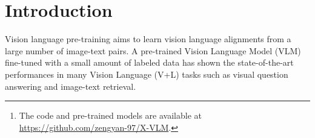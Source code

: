 \documentclass[nohyperref]{article}
\theoremstyle{plain}
\theoremstyle{definition}
\theoremstyle{remark}
\begin{document}





\printAffiliationsAndNotice{}  



\begin{abstract}
Most existing methods in vision language pre-training rely on object-centric features extracted through object detection and make fine-grained alignments between the extracted features and texts. It is challenging for these methods to learn relations among multiple objects. To this end, we propose a new method called X-VLM~\footnote{The code and pre-trained models are available at \url{https://github.com/zengyan-97/X-VLM}.} to perform `multi-grained vision language pre-training.' The key to learning multi-grained alignments is to locate visual concepts in the image given the associated texts, and in the meantime align the texts with the visual concepts, where the alignments are in multi-granularity. Experimental results show that X-VLM effectively leverages the learned multi-grained alignments to many downstream vision language tasks and consistently outperforms state-of-the-art methods.
\end{abstract}


\section{Introduction}
Vision language pre-training aims to learn vision language alignments from a large number of image-text pairs. A pre-trained Vision Language Model (VLM) fine-tuned with a small amount of labeled data has shown the state-of-the-art performances in many Vision Language (V+L) tasks such as visual question answering and image-text retrieval. 
\end{document}
